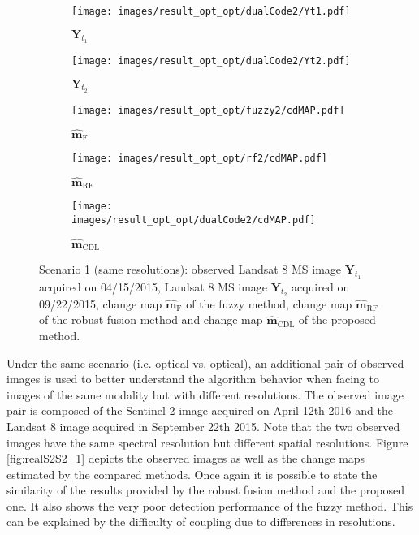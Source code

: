 \documentclass[review]{elsarticle}
\begin{document}
\newcommand{\subfwidth}{0.49\columnwidth}
\newcommand{\figsize}{1\columnwidth}

\begin{figure}[h!]
\centering
			\begin{subfigure}{\subfwidth}
					\centering	
					\texttt{[image: images/result\_opt\_opt/dualCode2/Yt1.pdf]}
					\caption{$\mathbf{Y}_{t_1}$}
					\label{fig:s2s2Yt1_2}
			\end{subfigure}
			\begin{subfigure}{\subfwidth}
					\centering	
					\texttt{[image: images/result\_opt\_opt/dualCode2/Yt2.pdf]}
					\caption{$\mathbf{Y}_{t_2}$}
					\label{fig:s2s2Yt2_2}
			\end{subfigure}
			\begin{subfigure}{\subfwidth}
					\centering
					\texttt{[image: images/result\_opt\_opt/fuzzy2/cdMAP.pdf]}
					\caption{$\hat{\mathbf{m}}_{\mathrm{F}}$}
					\label{fig:s2s2FMAP_2}
			\end{subfigure}
            \begin{subfigure}{\subfwidth}
					\centering
					\texttt{[image: images/result\_opt\_opt/rf2/cdMAP.pdf]}
					\caption{$\hat{\mathbf{m}}_{\mathrm{RF}}$}
					\label{fig:s2s2RFMAP_2}
			\end{subfigure}
            \begin{subfigure}{\subfwidth}
					\centering	
					\texttt{[image: images/result\_opt\_opt/dualCode2/cdMAP.pdf]}
					\caption{$\hat{\mathbf{m}}_{\mathrm{CDL}}$}
					\label{fig:s2s2DCMAP_2}
			\end{subfigure}
\caption{Scenario 1 (same resolutions): \protect{}  observed  Landsat 8 MS image $\mathbf{Y}_{t_1}$ acquired on 04/15/2015, \protect{}  Landsat 8 MS image $\mathbf{Y}_{t_2}$  acquired on 09/22/2015, \protect{} change map $\hat{\mathbf{m}}_{\mathrm{F}}$ of the fuzzy method, \protect{} change map $\hat{\mathbf{m}}_{\mathrm{RF}}$ of the robust fusion method
	 and \protect{} change map $\hat{\mathbf{m}}_{\mathrm{CDL}}$ of the proposed method.}%
	\label{fig:realS2S2_2}%
\end{figure}

Under the same scenario (i.e. optical vs. optical), an additional pair of observed images is used to better understand the algorithm behavior when facing to images of the same modality but with different resolutions. The observed image pair is composed of the Sentinel-2 image acquired on April 12th 2016 and the Landsat 8 image acquired in September 22th 2015. Note that the two observed images have the same spectral resolution but different spatial resolutions. Figure \ref{fig:realS2S2_1} depicts the observed images as well as the change maps estimated by the compared methods. Once again it is possible to state the similarity of the results provided by the robust fusion method and the proposed one. It also shows the very poor detection performance of the fuzzy method. This can be explained by the difficulty of coupling due to differences in resolutions.
\end{document}
